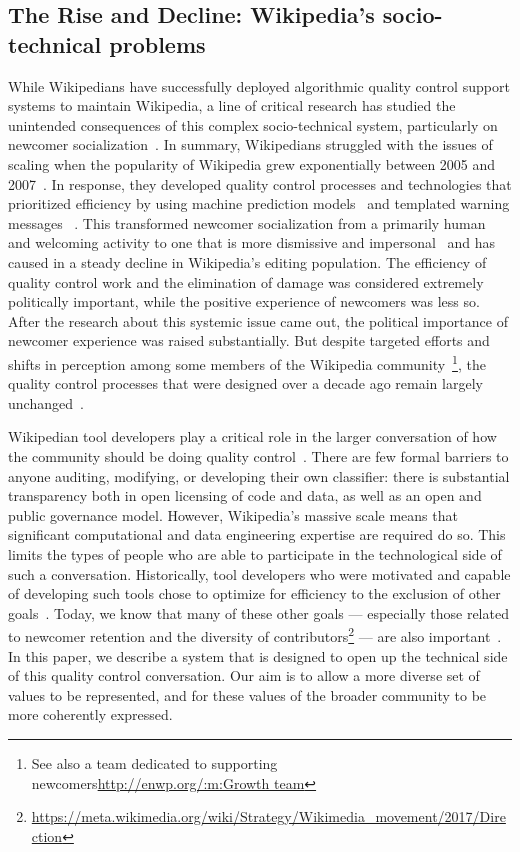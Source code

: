 \subsection{The Rise and Decline: Wikipedia's socio-technical problems}
While Wikipedians have successfully deployed algorithmic quality control support systems to maintain Wikipedia, a line of critical research has studied the unintended consequences of this complex socio-technical system, particularly on newcomer socialization~\cite{halfaker2013rise,morgan2013tea,halfaker2014snuggle}.  In summary, Wikipedians struggled with the issues of scaling when the popularity of Wikipedia grew exponentially between 2005 and 2007~\cite{halfaker2013rise}.  In response, they developed quality control processes and technologies that prioritized efficiency by using machine prediction models~\cite{halfaker2014snuggle} and templated warning messages~ \cite{halfaker2013rise}.  This transformed newcomer socialization from a primarily human and welcoming activity to one that is more dismissive and impersonal~\cite{morgan2013tea} and has caused in a steady decline in Wikipedia's editing population.  The efficiency of quality control work and the elimination of damage was considered extremely politically important, while the positive experience of newcomers was less so. After the research about this systemic issue came out, the political importance of newcomer experience was raised substantially.  But despite targeted efforts and shifts in perception among some members of the Wikipedia community~\cite{narayan2015effects, morgan2013tea}\footnote{See also a team dedicated to supporting newcomers\url{http://enwp.org/:m:Growth team}}, the quality control processes that were designed over a decade ago remain largely unchanged~\cite{halfaker2014snuggle}.

Wikipedian tool developers play a critical role in the larger conversation of how the community should be doing quality control~\cite{geiger2014bots, halfaker2014snuggle}. There are few formal barriers to anyone auditing, modifying, or developing their own classifier: there is substantial transparency both in open licensing of code and data, as well as an open and public governance model. However, Wikipedia's massive scale means that significant computational and data engineering expertise are required do so. This limits the types of people who are able to participate in the technological side of such a conversation.  Historically, tool developers who were motivated and capable of developing such tools chose to optimize for efficiency to the exclusion of other goals~\cite{halfaker2014snuggle}.  Today, we know that many of these other goals --- especially those related to newcomer retention and the diversity of contributors\footnote{\url{https://meta.wikimedia.org/wiki/Strategy/Wikimedia_movement/2017/Direction}} --- are also important~\cite{morgan2013tea, halfaker2013rise}.  In this paper, we describe a system that is designed to open up the technical side of this quality control conversation. Our aim is to allow a more diverse set of values to be represented, and for these values of the broader community to be more coherently expressed.